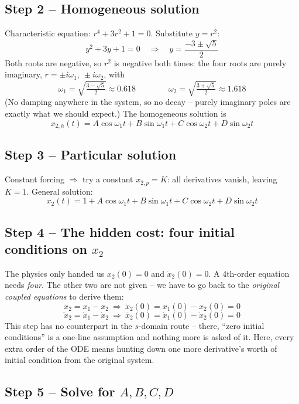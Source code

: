 \documentclass[11pt]{article}
\begin{document}
\subsection*{Step 2 -- Homogeneous solution}

Characteristic equation: $r^4+3r^2+1=0$. Substitute $y=r^2$:
\[
y^2+3y+1=0 \quad\Longrightarrow\quad y = \frac{-3\pm\sqrt5}{2}
\]
Both roots are negative, so $r^2$ is negative both times: the four roots
are purely imaginary, $r=\pm i\omega_1,\ \pm i\omega_2$, with
\[
\omega_1=\sqrt{\tfrac{3-\sqrt5}{2}}\approx 0.618
\qquad\qquad
\omega_2=\sqrt{\tfrac{3+\sqrt5}{2}}\approx 1.618
\]
(No damping anywhere in the system, so no decay -- purely imaginary
poles are exactly what we should expect.) The homogeneous solution is
\[
x_{2,h}(t) = A\cos\omega_1 t + B\sin\omega_1 t + C\cos\omega_2 t + D\sin\omega_2 t
\]

\subsection*{Step 3 -- Particular solution}

Constant forcing $\Rightarrow$ try a constant $x_{2,p}=K$: all derivatives
vanish, leaving $K=1$. General solution:
\[
x_2(t) = 1 + A\cos\omega_1 t + B\sin\omega_1 t + C\cos\omega_2 t + D\sin\omega_2 t
\]

\subsection*{Step 4 -- The hidden cost: four initial conditions on $x_2$}

The physics only handed us $x_2(0)=0$ and $\dot x_2(0)=0$. A 4th-order
equation needs \emph{four}. The other two are not given -- we have to go
back to the \emph{original coupled equations} to derive them:
\[
\ddot x_2 = x_1 - x_2 \ \Longrightarrow\ \ddot x_2(0) = x_1(0)-x_2(0) = 0
\]
\[
\dddot x_2 = \dot x_1 - \dot x_2 \ \Longrightarrow\ \dddot x_2(0) = \dot x_1(0)-\dot x_2(0) = 0
\]
This step has no counterpart in the $s$-domain route -- there, ``zero
initial conditions'' is a one-line assumption and nothing more is asked
of it. Here, every extra order of the ODE means hunting down one more
derivative's worth of initial condition from the original system.

\subsection*{Step 5 -- Solve for $A,B,C,D$}
\end{document}
